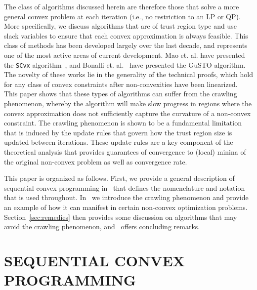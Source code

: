 \documentclass[letterpaper, 10 pt, conference]{ieeeconf}
\begin{document}
The class of algorithms discussed herein are therefore those that solve a more general convex problem at each iteration (i.e., no restriction to an LP or QP). More specifically, we discuss algorithms that are of trust region type and use slack variables to ensure that each convex approximation is always feasible. This class of methods has been developed largely over the last decade, and represents one of the most active areas of current development. Mao et. al. have presented the \texttt{SCvx} algorithm~\cite{Mao2016a,Mao2018}, and Bonalli et. al.~\cite{Bonalli2019,Bonalli2019b} have presented the GuSTO algorithm. The novelty of these works lie in the generality of the technical proofs, which hold for any class of convex constraints after non-convexities have been linearized. This paper shows that these types of algorithms can suffer from the crawling phenomenon, whereby the algorithm will make slow progress in regions where the convex approximation does not sufficiently capture the curvature of a non-convex constraint. The crawling phenomenon is shown to be a fundamental limitation that is induced by the update rules that govern how the trust region size is updated between iterations. These update rules are a key component of the theoretical analysis that provides guarantees of convergence to (local) minina of the original non-convex problem as well as convergence rate.

This paper is organized as follows. First, we provide a general description of sequential convex programming in~ that defines the nomenclature and notation that is used throughout. In~ we introduce the crawling phenomenon and provide an example of how it can manifest in certain non-convex optimization problems. Section~\ref{sec:remedies} then provides some discussion on algorithms that may avoid the crawling phenomenon, and~ offers concluding remarks.

\section{SEQUENTIAL CONVEX PROGRAMMING}\label{sec:scp}

\end{document}
